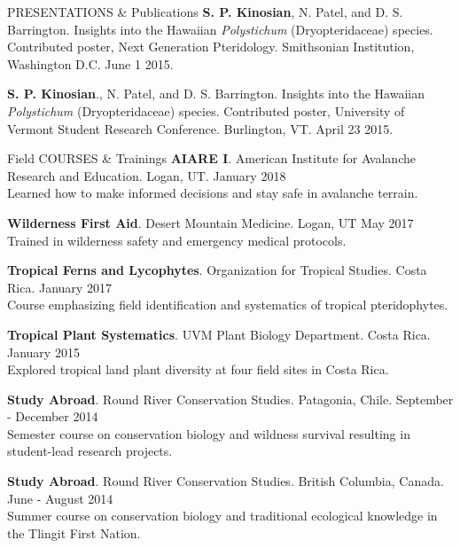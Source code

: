 \documentclass{resume} %
\begin{document}
\begin{rSection}{PRESENTATIONS \& Publications}
\textbf{S. P. Kinosian}, N. Patel, and D. S. Barrington. Insights into the Hawaiian \textit{Polystichum} (Dryopteridaceae) species. Contributed poster, Next Generation Pteridology. Smithsonian Institution, Washington D.C. June 1 2015.

\textbf{S. P. Kinosian}., N. Patel, and D. S. Barrington. Insights into the Hawaiian \textit{Polystichum} (Dryopteridaceae) species. Contributed poster, University of Vermont Student Research Conference. Burlington, VT. April 23 2015.
\end{rSection}


\begin{rSection}{Field COURSES \& Trainings}
\textbf{AIARE I}. American Institute for Avalanche Research and Education. Logan, UT. \hfill January 2018
\\
Learned how to make informed decisions and stay safe in avalanche terrain.

\textbf{Wilderness First Aid}. Desert Mountain Medicine. Logan, UT \hfill May 2017
\\
Trained in wilderness safety and emergency medical protocols.

\textbf{Tropical Ferns and Lycophytes}. Organization for Tropical Studies. Costa Rica. \hfill January 2017
\\
Course emphasizing field identification and systematics of tropical pteridophytes.

\textbf{Tropical Plant Systematics}. UVM Plant Biology Department. Costa Rica. \hfill January 2015
\\
Explored tropical land plant diversity at four field sites in Costa Rica.

\textbf{Study Abroad}. Round River Conservation Studies. Patagonia, Chile. \hfill September - December 2014
\\
Semester course on conservation biology and wildness survival resulting in student-lead research projects.

\textbf{Study Abroad}. Round River Conservation Studies. British Columbia, Canada. \hfill June - August 2014
\\
Summer course on conservation biology and traditional ecological knowledge in the Tlingit First Nation.

\end{rSection}
\end{document}
